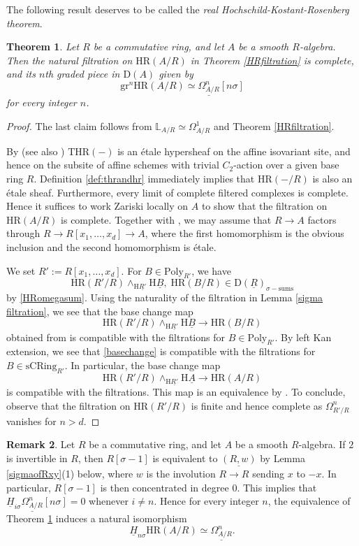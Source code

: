 \documentclass[10pt]{amsart}
\newtheorem{thm}{Theorem}[section]
\theoremstyle{definition}
\newtheorem{rmk}[thm]{Remark}
\numberwithin{equation}{section}
\renewcommand{\L}{\mathbb{L}}
\newcommand{\rD}{\mathrm{D}}
\newcommand{\rH}{\mathrm{H}}
\newcommand{\ul}{\underline}
\newcommand{\sCRing}{\mathrm{sCRing}}
\newcommand{\Poly}{\mathrm{Poly}}
\newcommand{\gr}{\mathrm{gr}}
\newcommand{\HR}{\mathrm{HR}}
\newcommand{\THR}{\mathrm{THR}}
\begin{document}
The following result deserves to be called the \emph{real
Hochschild-Kostant-Rosenberg theorem}.

\begin{thm}
\label{smoothHKR}
Let $R$ be a commutative ring,
and let $A$ be a smooth $R$-algebra.
Then the natural filtration on $\HR(A/R)$ in Theorem \ref{HRfiltration} is complete, and its $n$th graded piece in $\rD(A)$ given by
\[
\gr^n\HR(A/R)
\simeq
\ul{\Omega_{A/R}^n}[n\sigma]
\]
for every integer $n$.
\end{thm}
\begin{proof}
The last claim follows from $\L_{A/R}\simeq \Omega_{A/R}^1$ and Theorem \ref{HRfiltration}.

By \cite[Theorem 3.4.3]{HP23} (see also \cite{HP23erratum}) 
$\THR(-)$ is an \'etale hypersheaf on the affine isovariant site, and hence on the subsite of affine schemes with trivial $C_2$-action over a given base ring $R$. Definition \ref{def:thrandhr} immediately implies that $\HR(-/R)$ is also an \'etale sheaf.
Furthermore,
every limit of complete filtered complexes is complete.
Hence it suffices to work Zariski locally on $A$ to show that the filtration on $\HR(A/R)$ is complete.
Together with \cite[Corollaire IV.17.11.4]{EGA},
we may assume that $R\to A$ factors through $R\to R[x_1,\ldots,x_d]\to A$,
where the first homomorphism is the obvious inclusion and the second homomorphism is \'etale.

We set $R':=R[x_1,\ldots,x_d]$.
For $B\in \Poly_{R'}$,
we have
\[
\HR(R'/R)\wedge_{\rH \ul{R'}}\rH \ul{B},
\;
\HR(B/R)
\in
\rD(\ul{R})_{\sigma-\mathrm{sums}}
\]
by \eqref{HRomegasum}.
Using the naturality of the filtration in Lemma \ref{sigma filtration},
we see that the base change map
\begin{equation}
\label{basechange}
\HR(R'/R)\wedge_{\rH \ul{R'}}\rH \ul{B}
\to
\HR(B/R)
\end{equation}
obtained from \cite[(3.1)]{HP23} is compatible with the filtrations for $B\in \Poly_{R'}$.
By left Kan extension,
we see that \eqref{basechange} is compatible with the filtrations for $B\in \sCRing_{R'}$.
In particular, the base change map
\[
\HR(R'/R)\wedge_{\rH \ul{R'}}\rH \ul{A}
\to
\HR(A/R)
\]
is compatible with the filtrations.
This map is an equivalence by \cite[Theorem 3.2.3]{HP23}.
To conclude,
observe that the filtration on $\HR(R'/R)$ is finite and hence complete as $\Omega^n_{R'/R}$ vanishes for $n>d$.
\end{proof}

\begin{rmk}
Let $R$ be a commutative ring,
and let $A$ be a smooth $R$-algebra.
If $2$ is invertible in $R$, then $R[\sigma-1]$ is equivalent to $\ul{(R,w)}$ by Lemma \ref{sigmaofRxy}(1) below, where $w$ is the involution $R\to R$ sending $x$ to $-x$. In particular, $R[\sigma-1]$ is  then concentrated in degree $0$.
This implies that $\ul{H}_{i\sigma} \ul{\Omega_{A/R}^n}[n\sigma]=0$ whenever $i\neq n$.
Hence for every integer $n$,
the equivalence of Theorem \ref{smoothHKR} induces a natural isomorphism
\[
\ul{H}_{n\sigma}\HR(A/R)
\simeq
\ul{\Omega_{A/R}^n}.
\]
\end{rmk}
\end{document}
